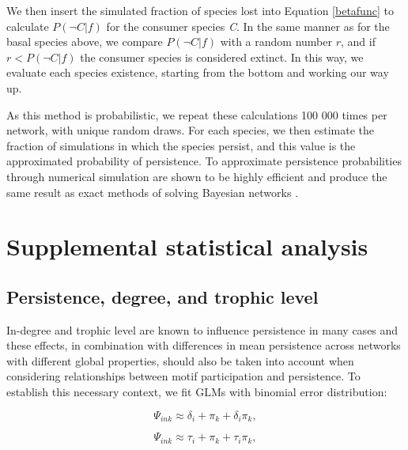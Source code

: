 \documentclass[12pt]{article}
\begin{document}
\begin{spacing}{2.0}
        
        We then insert the simulated fraction of species lost into Equation \ref{betafunc} to calculate $P(\lnot C|f)$ for the consumer species \textit{C}. 
        In the same manner as for the basal species above, we compare $P(\lnot C|f)$ with a random number $r$, and if $r < P(\lnot C|f)$ the consumer species is considered extinct. 
        In this way, we evaluate each species existence, starting from the bottom and working our way up.
        
        
        As this method is probabilistic, we repeat these calculations 100 000 times per network, with unique random draws.
        For each species, we then estimate the fraction of simulations in which the species persist, and this value is the approximated probability of persistence.
        To approximate persistence probabilities through numerical simulation are shown to be highly efficient and produce the same result as exact methods of solving Bayesian networks \citep{Haussler2020}.
        
        
\clearpage



\section{Supplemental statistical analysis}

    \subsection{Persistence, degree, and trophic level}
    
            In-degree and trophic level are known to influence persistence in many cases and these effects, in combination with differences in mean persistence across networks with different global properties, should also be taken into account when considering relationships between motif participation and persistence.
            To establish this necessary context, we fit GLMs with binomial error distribution:

            \begin{spacing}{1.0}
            \begin{multicols}{2}
            \begin{equation}
                    \Psi_{ink} \approx \delta_{i} + \pi_{k} + \delta_{i}\pi_{k},
                    \label{degeq}
                \end{equation}
        
            \begin{equation}
                    \Psi_{ink} \approx \tau_{i} + \pi_{k} + \tau_{i}\pi_{k},
                    \label{TLeq}
                \end{equation}
            \end{multicols}
            \end{spacing}
        

\end{spacing}
\end{document}
